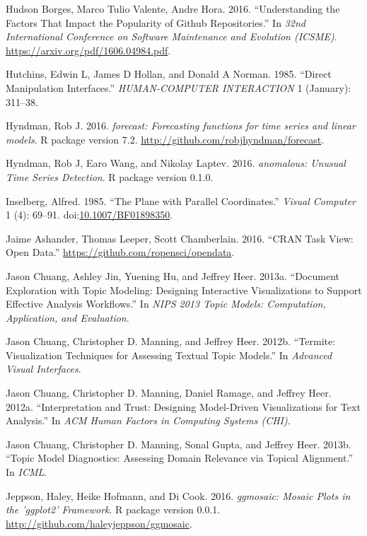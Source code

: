 \documentclass[12pt,]{isuthesis}
\begin{document}
\hypertarget{ref-stars}{}
Hudson Borges, Marco Tulio Valente, Andre Hora. 2016. ``Understanding
the Factors That Impact the Popularity of Github Repositories.'' In
\emph{32nd International Conference on Software Maintenance and
Evolution (ICSME)}. \url{https://arxiv.org/pdf/1606.04984.pdf}.

\hypertarget{ref-Hutchins:1985wu}{}
Hutchins, Edwin L, James D Hollan, and Donald A Norman. 1985. ``Direct
Manipulation Interfaces.'' \emph{HUMAN-COMPUTER INTERACTION} 1
(January): 311--38.

\hypertarget{ref-forecast}{}
Hyndman, Rob J. 2016. \emph{forecast: Forecasting functions for time
series and linear models}. R package version 7.2.
\url{http://github.com/robjhyndman/forecast}.

\hypertarget{ref-anomalous}{}
Hyndman, Rob J, Earo Wang, and Nikolay Laptev. 2016. \emph{anomalous:
Unusual Time Series Detection}. R package version 0.1.0.

\hypertarget{ref-Inselberg:85}{}
Inselberg, Alfred. 1985. ``The Plane with Parallel Coordinates.''
\emph{Visual Computer} 1 (4): 69--91.
doi:\href{https://doi.org/10.1007/BF01898350}{10.1007/BF01898350}.

\hypertarget{ref-OpenData}{}
Jaime Ashander, Thomas Leeper, Scott Chamberlain. 2016. ``CRAN Task
View: Open Data.'' \url{https://github.com/ropensci/opendata}.

\hypertarget{ref-2013-termite}{}
Jason Chuang, Ashley Jin, Yuening Hu, and Jeffrey Heer. 2013a.
``Document Exploration with Topic Modeling: Designing Interactive
Visualizations to Support Effective Analysis Workflows.'' In \emph{NIPS
2013 Topic Models: Computation, Application, and Evaluation}.

\hypertarget{ref-2012-termite}{}
Jason Chuang, Christopher D. Manning, and Jeffrey Heer. 2012b.
``Termite: Visualization Techniques for Assessing Textual Topic
Models.'' In \emph{Advanced Visual Interfaces}.

\hypertarget{ref-2012-trust}{}
Jason Chuang, Christopher D. Manning, Daniel Ramage, and Jeffrey Heer.
2012a. ``Interpretation and Trust: Designing Model-Driven Visualizations
for Text Analysis.'' In \emph{ACM Human Factors in Computing Systems
(CHI)}.

\hypertarget{ref-2013-diagnostics}{}
Jason Chuang, Christopher D. Manning, Sonal Gupta, and Jeffrey Heer.
2013b. ``Topic Model Diagnostics: Assessing Domain Relevance via Topical
Alignment.'' In \emph{ICML}.

\hypertarget{ref-ggmosaic}{}
Jeppson, Haley, Heike Hofmann, and Di Cook. 2016. \emph{ggmosaic: Mosaic
Plots in the 'ggplot2' Framework}. R package version 0.0.1.
\url{http://github.com/haleyjeppson/ggmosaic}.
\end{document}
